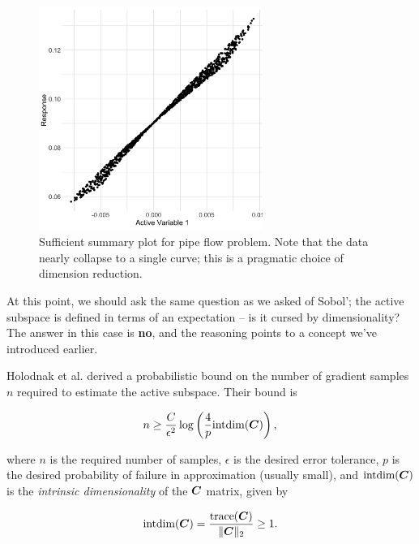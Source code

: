 \documentclass{article}
\begin{document}
\begin{figure}[!ht]
  \centering
  \includegraphics[width=0.65\textwidth]{../../images/as_summary_nat}
  \caption{Sufficient summary plot for pipe flow problem. Note that the data
    nearly collapse to a single curve; this is a pragmatic choice of dimension
    reduction.}
  \label{fig:as-pipe-summary-nat}
\end{figure}

At this point, we should ask the same question as we asked of Sobol'; the active
subspace is defined in terms of an expectation -- is it cursed by
dimensionality? The answer in this case is \textbf{no}, and the reasoning points
to a concept we've introduced earlier.

Holodnak et al.\cite{holodnak2018probabilistic} derived a probabilistic bound on
the number of gradient samples $n$ required to estimate the active subspace.
Their bound is

\begin{equation}
  n \geq \frac{C}{\epsilon^2}\log\left(\frac{4}{p}\text{intdim}(\boldsymbol{C})\right),
\end{equation}

\noindent where $n$ is the required number of samples, $\epsilon$ is the desired
error tolerance, $p$ is the desired probability of failure in approximation
(usually small), and $\text{intdim}(\boldsymbol{C})$ is the \emph{intrinsic dimensionality}
of the $\boldsymbol{C}$ matrix, given by

\begin{equation} \label{eq:int-dim}
  \text{intdim}(\boldsymbol{C}) = \frac{\text{trace}(\boldsymbol{C})}{\|\boldsymbol{C}\|_2} \geq 1.
\end{equation}

\noindent {}
\end{document}
